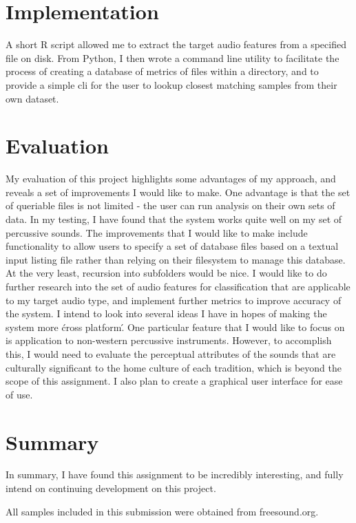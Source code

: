 \documentclass[a4paper,12pt]{article}
\begin{document}
\section{Implementation}
A short R script allowed me to extract the target audio features from a specified file on disk. From Python, I then wrote a command line utility to facilitate the process of creating a database of metrics of files within a directory, and to provide a simple cli for the user to lookup closest matching samples from their own dataset.

\section{Evaluation}
My evaluation of this project highlights some advantages of my approach, and reveals a set of improvements I would like to make. One advantage is that the set of queriable files is not limited - the user can run analysis on their own sets of data. In my testing, I have found that the system works quite well on my set of percussive sounds. The improvements that I would like to make include functionality to allow users to specify a set of database files based on a textual input listing file rather than relying on their filesystem to manage this database. At the very least, recursion into subfolders would be nice. I would like to do further research into the set of audio features for classification that are applicable to my target audio type, and implement further metrics to improve accuracy of the system. I intend to look into several ideas I have in hopes of making the system more \'cross platform\'. One particular feature that I would like to focus on is application to non-western percussive instruments. However, to accomplish this, I would need to evaluate the perceptual attributes of the sounds that are culturally significant to the home culture of each tradition\cite{lidy2010suitability}, which is beyond the scope of this assignment. I also plan to create a graphical user interface for ease of use.

\section{Summary}
In summary, I have found this assignment to be incredibly interesting, and fully intend on continuing development on this project.





All samples included in this submission were obtained from freesound.org.
\end{document}
